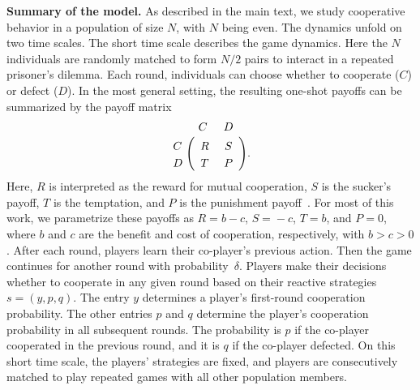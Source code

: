 \documentclass[11pt]{article}
\def\strategy{s}
\theoremstyle{plainCl1}
\theoremstyle{plainCl2}
\begin{document}
\noindent
{\bf Summary of the model.} As described in the main text, we study cooperative behavior in a population of size $N$, with $N$ being even.
The dynamics unfold on two time scales. 
The short time scale describes the game dynamics. 
Here the $N$ individuals are randomly matched to form $N/2$ pairs to interact in a repeated prisoner's dilemma.  
Each round, individuals can choose whether to cooperate ($C$) or defect ($D$). 
In the most general setting, the resulting one-shot payoffs can be summarized by the payoff matrix 
\begin{align}
	\bordermatrix{%
		& C & D \cr
		C &\ R &\ S\  \cr
		D &\ T &\ P\ \cr
	} . \label{eq:prisoner}
\end{align}
Here, $R$ is interpreted as the reward for mutual cooperation, $S$ is the sucker's payoff, $T$ is the temptation, and $P$ is the punishment payoff~\citep{axelrod1981evolution}. 
For most of this work, we parametrize these payoffs as $R\!=\!b\!-\!c$, $S\!=\!-c$, $T\!=\!b$, and $P\!=\!0$, where $b$ and $c$ are the benefit and cost of cooperation, respectively, with $b\!>\!c\!>0$. 
After each round, players learn their co-player's previous action. 
Then the game continues for another round with probability~$\delta$.
Players make their decisions whether to cooperate in any given round based on their reactive strategies $\strategy\!=\!(y,p,q)$. 
The entry $y$ determines a player's first-round cooperation probability. 
The other entries $p$ and $q$ determine the player's cooperation probability in all subsequent rounds. 
The probability is $p$ if the co-player cooperated in the previous round, and it is $q$ if the co-player defected. 
On this short time scale, the players' strategies are fixed, and players are consecutively matched to play repeated games with all other population members. 

\end{document}
